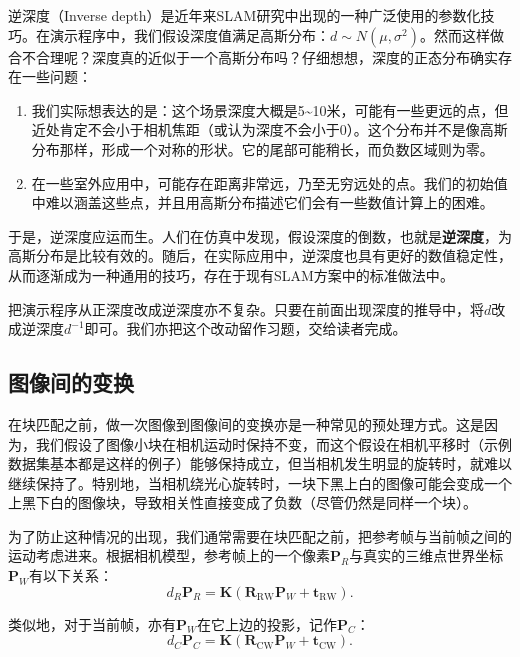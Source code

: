 逆深度（Inverse depth）是近年来SLAM研究中出现的一种广泛使用的参数化技巧\textsuperscript{\cite{Montiel2006, Civera2008}}。在演示程序中，我们假设深度值满足高斯分布：$d \sim N(\mu, \sigma^2)$。然而这样做合不合理呢？深度真的近似于一个高斯分布吗？仔细想想，深度的正态分布确实存在一些问题：

\begin{enumerate}
	\item 我们实际想表达的是：这个场景深度大概是5\textasciitilde10米，可能有一些更远的点，但近处肯定不会小于相机焦距（或认为深度不会小于0）。这个分布并不是像高斯分布那样，形成一个对称的形状。它的尾部可能稍长，而负数区域则为零。
	\item 在一些室外应用中，可能存在距离非常远，乃至无穷远处的点。我们的初始值中难以涵盖这些点，并且用高斯分布描述它们会有一些数值计算上的困难。
\end{enumerate}

于是，逆深度应运而生。人们在仿真中发现，假设深度的倒数，也就是\textbf{逆深度}，为高斯分布是比较有效的\textsuperscript{\cite{Civera2008}}。随后，在实际应用中，逆深度也具有更好的数值稳定性，从而逐渐成为一种通用的技巧，存在于现有SLAM方案中的标准做法中\textsuperscript{\cite{Forster2014, Engel2014, Mur-Artal2015}}。

把演示程序从正深度改成逆深度亦不复杂。只要在前面出现深度的推导中，将$d$改成逆深度$d^{-1}$即可。我们亦把这个改动留作习题，交给读者完成。

\subsection{图像间的变换}
在块匹配之前，做一次图像到图像间的变换亦是一种常见的预处理方式。这是因为，我们假设了图像小块在相机运动时保持不变，而这个假设在相机平移时（示例数据集基本都是这样的例子）能够保持成立，但当相机发生明显的旋转时，就难以继续保持了。特别地，当相机绕光心旋转时，一块下黑上白的图像可能会变成一个上黑下白的图像块，导致相关性直接变成了负数（尽管仍然是同样一个块）。

为了防止这种情况的出现，我们通常需要在块匹配之前，把参考帧与当前帧之间的运动考虑进来。根据相机模型，参考帧上的一个像素$\bm{P}_R$与真实的三维点世界坐标$\bm{P}_W$有以下关系：
\begin{equation}
d_R {\bm{P}_R} = \bm{K} \left( {{\bm{R}_{\mathrm{RW}}}{\bm{P}_W} + {\bm{t}_{\mathrm{RW}}}} \right).
\end{equation}

类似地，对于当前帧，亦有$\bm{P}_W$在它上边的投影，记作$\bm{P}_C$：
\begin{equation}
d_C {\bm{P}_C} = \bm{K} \left( {{\bm{R}_{\mathrm{CW}}}{\bm{P}_W} + {\bm{t}_{\mathrm{CW}}}} \right).
\end{equation}

